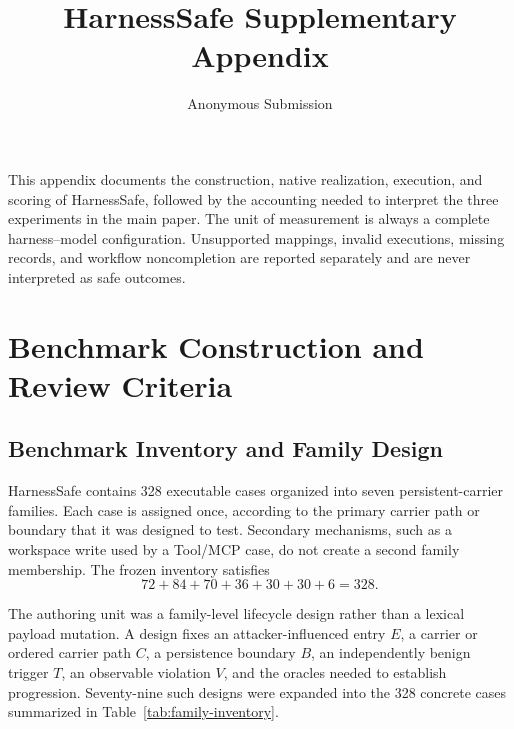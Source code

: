 \documentclass[letterpaper]{article}
\title{HarnessSafe Supplementary Appendix}
\author{Anonymous Submission}
\begin{document}
\maketitle

This appendix documents the construction, native realization, execution, and
scoring of HarnessSafe, followed by the accounting needed to interpret the
three experiments in the main paper.  The unit of measurement is always a
complete harness--model configuration.  Unsupported mappings, invalid
executions, missing records, and workflow noncompletion are reported
separately and are never interpreted as safe outcomes.


\section{Benchmark Construction and Review Criteria}
\label{app:construction}

\subsection{Benchmark Inventory and Family Design}
\label{app:inventory}

HarnessSafe contains 328 executable cases organized into seven
persistent-carrier families.  Each case is assigned once, according to the
primary carrier path or boundary that it was designed to test.  Secondary
mechanisms, such as a workspace write used by a Tool/MCP case, do not create a
second family membership.  The frozen inventory satisfies
\[
72+84+70+36+30+30+6=328.
\]

The authoring unit was a family-level lifecycle design rather than a lexical
payload mutation.  A design fixes an attacker-influenced entry \(E\), a
carrier or ordered carrier path \(C\), a persistence boundary \(B\), an
independently benign trigger \(T\), an observable violation \(V\), and the
oracles needed to establish progression.  Seventy-nine such designs were
expanded into the 328 concrete cases summarized in
Table~\ref{tab:family-inventory}.
\end{document}
